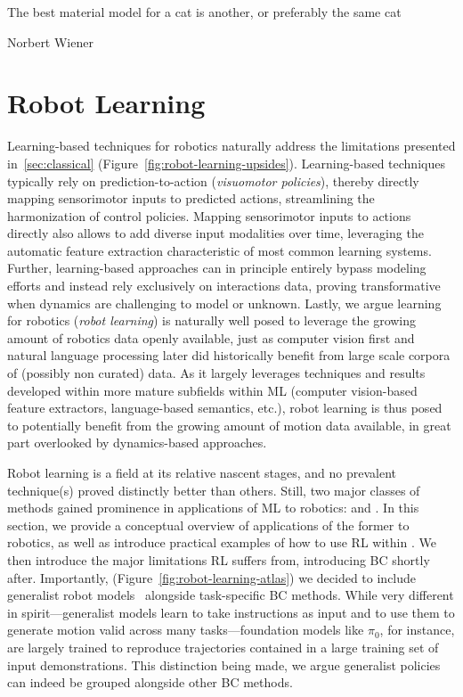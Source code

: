 \epigraph{The best material model for a cat is another, or preferably the same cat}{Norbert Wiener}

\section{Robot Learning}
\label{sec:learning}

Learning-based techniques for robotics naturally address the limitations presented in~\ref{sec:classical} (Figure~\ref{fig:robot-learning-upsides}).
Learning-based techniques typically rely on prediction-to-action (\emph{visuomotor policies}), thereby directly mapping sensorimotor inputs to predicted actions, streamlining the harmonization of control policies.
Mapping sensorimotor inputs to actions directly also allows to add diverse input modalities over time, leveraging the automatic feature extraction characteristic of most common learning systems.
Further, learning-based approaches can in principle entirely bypass modeling efforts and instead rely exclusively on interactions data, proving transformative when dynamics are challenging to model or unknown.
Lastly, we argue learning for robotics (\emph{robot learning}) is naturally well posed to leverage the growing amount of robotics data openly available, just as computer vision first and natural language processing later did historically benefit from large scale corpora of (possibly non curated) data.
As it largely leverages techniques and results developed within more mature subfields within ML (computer vision-based feature extractors, language-based semantics, etc.), robot learning is thus posed to potentially benefit from the growing amount of motion data available, in great part overlooked by dynamics-based approaches.

Robot learning is a field at its relative nascent stages, and no prevalent technique(s) proved distinctly better than others.
Still, two major classes of methods gained prominence in applications of ML to robotics:  and .
In this section, we provide a conceptual overview of applications of the former to robotics, as well as introduce practical examples of how to use RL within \lerobot.
We then introduce the major limitations RL suffers from, introducing BC shortly after.
Importantly, (Figure~\ref{fig:robot-learning-atlas}) we decided to include generalist robot models~\citep{blackpi0VisionLanguageActionFlow2024,shukorSmolVLAVisionLanguageActionModel2025} alongside task-specific BC methods.
While very different in spirit---generalist models learn to take instructions as input and to use them to generate motion valid across many tasks---foundation models like \( \pi_0 \), for instance, are largely trained to reproduce trajectories contained in a large training set of input demonstrations.
This distinction being made, we argue generalist policies can indeed be grouped alongside other BC methods.


